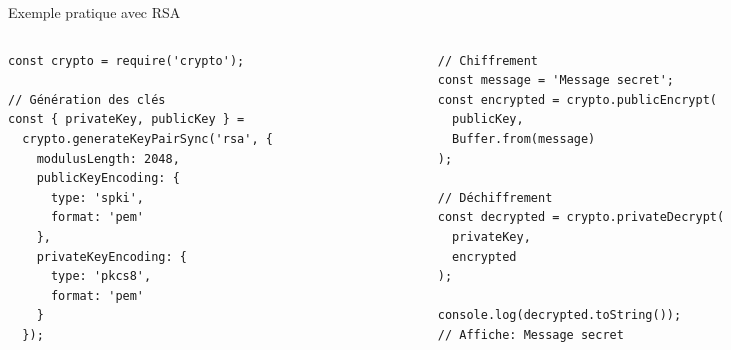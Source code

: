 \begin{frame}[fragile]{Exemple pratique avec RSA}
  \begin{columns}
    \begin{column}{0.48\textwidth}
      \begin{verbatim}
const crypto = require('crypto');

// Génération des clés
const { privateKey, publicKey } = 
  crypto.generateKeyPairSync('rsa', {
    modulusLength: 2048,
    publicKeyEncoding: {
      type: 'spki',
      format: 'pem'
    },
    privateKeyEncoding: {
      type: 'pkcs8',
      format: 'pem'
    }
  });
      \end{verbatim}
    \end{column}

    \begin{column}{0.48\textwidth}
      \begin{verbatim}
// Chiffrement
const message = 'Message secret';
const encrypted = crypto.publicEncrypt(
  publicKey,
  Buffer.from(message)
);

// Déchiffrement
const decrypted = crypto.privateDecrypt(
  privateKey,
  encrypted
);

console.log(decrypted.toString());
// Affiche: Message secret
      \end{verbatim}
    \end{column}
  \end{columns}
\end{frame}

